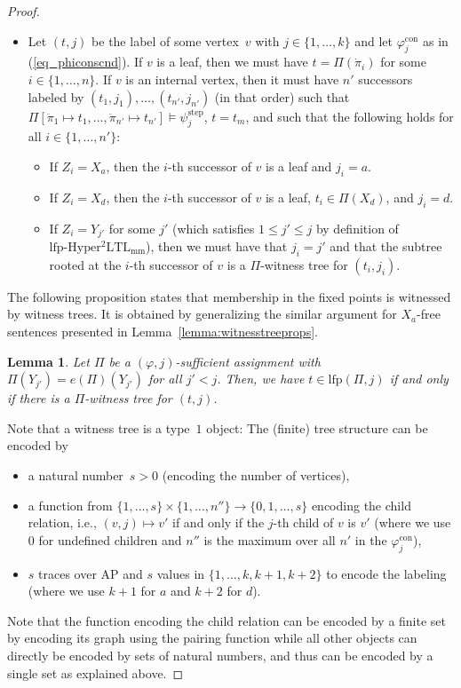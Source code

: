 \documentclass[dvipsnames,10pt,a4paper]{amsart}
\newtheorem{lem}[thm]{Lemma}
\theoremstyle{definition}
\theoremstyle{remark}
\renewcommand{\phi}{\varphi}
\newcommand{\set}[1]{\{#1\}}
\newcommand{\lfpsohyltlfp}{\mathrm{lfp\text{-}{Hyper^2LTL_{\mathrm{mm}}}}\xspace}
\newcommand{\ap}[0]{\mathrm{AP}}
\newcommand{\univar}{X_a}
\newcommand{\unidisvar}{X_d}
\newcommand{\con}{\mathrm{con}}
\newcommand{\step}{\mathrm{step}}
\newcommand{\overdot}[1]{\dot{#1}}
\newcommand{\overdotdot}[1]{\ddot{#1}}
\newcommand{\lfp}{\mathrm{lfp}}
\newcommand{\itereval}{e}
\begin{document}
\begin{proof}
\begin{itemize}
    \item Let $(t,j)$ be the label of some vertex~$v$ with $j \in \set{1,\ldots, k}$ and let $\phi_j^\con$ as in (\ref{eq_phiconscnd}).
If $v$ is a leaf, then we must have $t = \Pi(\overdot{\pi}_i)$ for some $i \in \set{1, \ldots, n}$.
If $v$ is an internal vertex, then it must have $n'$ successors labeled by $(t_1,j_1),\ldots,(t_{n'},j_{n'})$ (in that order) such that $\Pi[\overdotdot{\pi}_1 \mapsto t_1, \ldots, \overdotdot{\pi}_{n'} \mapsto t_{n'}] \models \psi^\step_j $, $t = t_m$, and
such that the following holds for all $i \in \set{1, \ldots, n'}$:
\begin{itemize}
    \item If $Z_i = \univar$, then the $i$-th successor of $v$ is a leaf and $j_i = a$.    
    
    \item If $Z_i = \unidisvar$, then the $i$-th successor of $v$ is a leaf, $t_i \in \Pi(\unidisvar)$, and $j_i = d$.
    
    \item If $Z_i = Y_{j'}$ for some $j'$ (which satisfies $1 \le j' \le j$ by definition of $\lfpsohyltlfp$), then we must have that $ j_i = j'$ and that the subtree rooted at the $i$-th successor of $v$ is a $\Pi$-witness tree for $(t_i,j_i)$.
\end{itemize}
\end{itemize}

The following proposition states that membership in the fixed points is witnessed by witness trees. It is obtained by generalizing the similar argument for $\univar$-free sentences presented in Lemma~\ref{lemma:witnesstreeprops}.

\begin{lem}
Let $\Pi$ be a $(\phi, j)$-sufficient assignment with $\Pi(Y_{j'}) = \itereval(\Pi)(Y_{j'})$ for all $j' < j$.
Then, we have $t \in \lfp(\Pi, j)$ if and only if there is a $\Pi$-witness tree for $(t,j)$.
\end{lem}

Note that a witness tree is a type~$1$ object: The (finite) tree structure can be encoded by 
\begin{itemize}
    \item a natural number~$s>0$ (encoding the number of vertices), 
    \item a function from $\set{1,\ldots, s} \times \set{1,\ldots, n''} \rightarrow \set{0,1,\ldots, s}$ encoding the child relation, i.e., $(v,j) \mapsto v'$ if and only if the $j$-th child of $v$ is $v'$ (where we use $0$ for undefined children and $n''$ is the maximum over all $n'$ in the $\phi_j^\con$), 
    \item $s$ traces over $\ap$ and $s$ values in $\set{1,\ldots, k, k+1, k+2}$ to encode the labeling (where we use $k+1$ for $a$ and $k+2$ for $d$).
\end{itemize}
Note that the function encoding the child relation can be encoded by a finite set by encoding its graph using the pairing function while all other objects can directly be encoded by sets of natural numbers, and thus can be encoded by a single set as explained above.


\end{proof}
\end{document}
